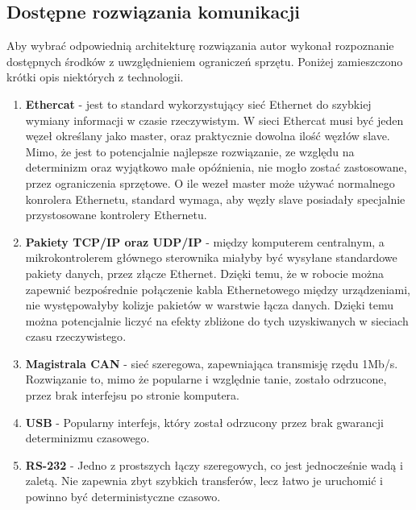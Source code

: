 \documentclass[a4paper, 12pt]{article}
\begin{document}
	\subsection{Dostępne rozwiązania komunikacji}
	Aby wybrać odpowiednią architekturę rozwiązania autor wykonał rozpoznanie dostępnych środków z uwzględnieniem ograniczeń sprzętu. Poniżej zamieszczono krótki opis niektórych z technologii.
	\begin{enumerate}
		\item \textbf{Ethercat} - jest to standard wykorzystujący sieć Ethernet do szybkiej wymiany informacji w czasie rzeczywistym. W sieci Ethercat musi być jeden węzeł określany jako master, oraz praktycznie dowolna ilość węzłów slave. Mimo, że jest to potencjalnie najlepsze rozwiązanie, ze względu na determinizm oraz wyjątkowo małe opóźnienia, nie mogło zostać zastosowane, przez ograniczenia sprzętowe. O ile wezeł master może używać normalnego konrolera Ethernetu, standard wymaga, aby węzły slave posiadały specjalnie przystosowane kontrolery Ethernetu\cite{EtherCATWiki}.
		\item \textbf{Pakiety TCP/IP oraz UDP/IP} - między komputerem centralnym, a mikrokontrolerem głównego sterownika miałyby być wysyłane standardowe pakiety danych, przez złącze Ethernet. Dzięki temu, że w robocie można zapewnić bezpośrednie połączenie kabla Ethernetowego między urządzeniami, nie występowałyby kolizje pakietów w warstwie łącza danych. Dzięki temu można potencjalnie liczyć na efekty zbliżone do tych uzyskiwanych w sieciach czasu rzeczywistego\cite{ProgramowanieAplikacjiSieciowych}.
		\item \textbf{Magistrala CAN} - sieć szeregowa, zapewniająca transmisję rzędu 1Mb/s. Rozwiązanie to, mimo że popularne i względnie tanie, zostało odrzucone, przez brak interfejsu po stronie komputera\cite{CANWiki}.
		\item \textbf{USB} - Popularny interfejs, który został odrzucony przez brak gwarancji determinizmu czasowego\cite{USB}.
		\item \textbf{RS-232} - Jedno z prostszych łączy szeregowych, co jest jednocześnie wadą i zaletą. Nie zapewnia zbyt szybkich transferów, lecz łatwo je uruchomić i powinno być deterministyczne czasowo\cite{RS}.
	\end{enumerate}
\end{document}
